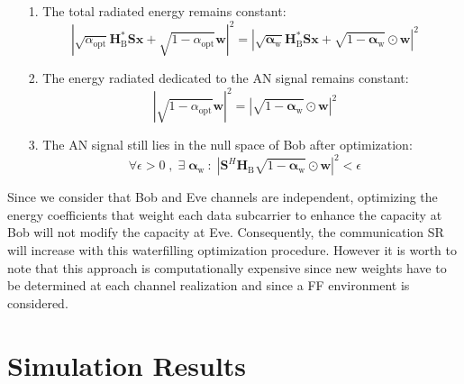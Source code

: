 \documentclass[journal,comsoc]{IEEEtran}
\newcommand{\module}[1]{\left|#1\right|}
\newcommand{\HB}{\textbf{H}_{\text{B}}}
\newcommand{\spread}{\textbf{S}}
\newcommand{\w}{\textbf{w}}
\begin{document}
\begin{itemize}
	\item[1.] The total radiated energy remains constant:
	\begin{equation}
	\module{\sqrt{\alpha_{\text{opt}}} \HB^* \spread \textbf{x} + \sqrt{1-\alpha_{\text{opt}}}  \w }^2  =   \module{\sqrt{\boldsymbol\alpha_{\text{w}}}  \HB^* \spread \textbf{x} + \sqrt{1-\boldsymbol\alpha_{\text{w}}} \odot  \w }^2
	\end{equation}
	\item[2.] The energy radiated dedicated to the AN signal remains constant:
	\begin{equation}
	\module{\sqrt{1-\alpha_{\text{opt}}}\w}^2 = \module{\sqrt{1-\boldsymbol\alpha_{\text{w}}} \odot\w}^2
	\end{equation}
	\item[3.] The AN signal still lies in the null space of Bob after optimization:
	\begin{equation}
	\forall \epsilon > 0 \; , \; \exists \;  \boldsymbol\alpha_{\text{w}} \: : \; \left|\spread^H \HB \sqrt{1-\boldsymbol\alpha_{\text{w}}}\odot \w\right|^2 < \epsilon
	\end{equation}
\end{itemize}
Since we consider that Bob and Eve channels are independent, optimizing the energy coefficients that weight each data subcarrier to enhance the capacity at Bob will not modify the capacity at Eve. Consequently, the communication SR will increase with this waterfilling optimization procedure. However it is worth to note that this approach is computationally expensive since new weights have to be determined at each channel realization and since a FF environment is considered. 



\section{Simulation Results} \label{sec:simulation-results}



\end{document}

